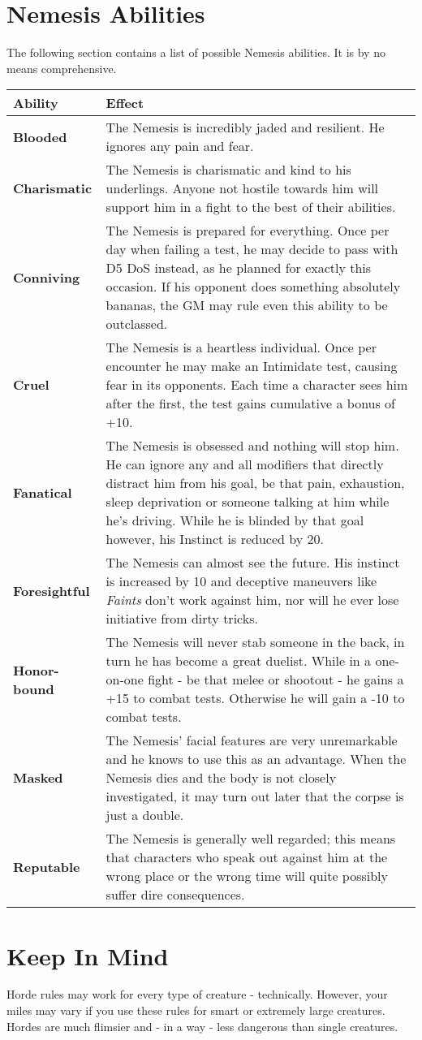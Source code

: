 \documentclass[12pt,a4paper,openany]{book}
\begin{document}
	\section*{Nemesis Abilities}
	The following section contains a list of possible Nemesis abilities. It is by no means comprehensive.
	{\setlength{\extrarowheight}{5pt}
	\begin{tabularx}{\textwidth}{l|X}
		Ability & Effect\\
		\hline
		\textbf{Blooded} & The Nemesis is incredibly jaded and resilient. He ignores any pain and fear.\\
		\hline
		\textbf{Charismatic} & The Nemesis is charismatic and kind to his underlings. Anyone not hostile towards him will support him in a fight to the best of their abilities.\\
		\hline
		\textbf{Conniving} & The Nemesis is prepared for everything. Once per day when failing a test, he may decide to pass with D5 DoS instead, as he planned for exactly this occasion. If his opponent does something absolutely bananas, the GM may rule even this ability to be outclassed.\\
		\hline
		\textbf{Cruel} & The Nemesis is a heartless individual. Once per encounter he may make an Intimidate test, causing fear in its opponents. Each time a character sees him after the first, the test gains cumulative a bonus of +10.\\
		\hline
		\textbf{Fanatical} & The Nemesis is obsessed and nothing will stop him. He can ignore any and all modifiers that directly distract him from his goal, be that pain, exhaustion, sleep deprivation or someone talking at him while he's driving. While he is blinded by that goal however, his Instinct is reduced by 20.\\
		\hline
		\textbf{Foresightful} & The Nemesis can almost see the future. His instinct is increased by 10 and deceptive maneuvers like \emph{Faints} don't work against him, nor will he ever lose initiative from dirty tricks.\\
		\hline
		\textbf{Honor-bound} & The Nemesis will never stab someone in the back, in turn he has become a great duelist. While in a one-on-one fight - be that melee or shootout - he gains a +15 to combat tests. Otherwise he will gain a -10 to combat tests.\\
		\hline
		\textbf{Masked} & The Nemesis' facial features are very unremarkable and he knows to use this as an advantage. When the Nemesis dies and the body is not closely investigated, it may turn out later that the corpse is just a double.\\
		\hline
		\textbf{Reputable} & The Nemesis is generally well regarded; this means that characters who speak out against him at the wrong place or the wrong time will quite possibly suffer dire consequences.
	\end{tabularx}}
	\section*{Keep In Mind}
	Horde rules may work for every type of creature - technically. However, your miles may vary if you use these rules for smart or extremely large creatures. Hordes are much flimsier and - in a way - less dangerous than single creatures.
\end{document}
